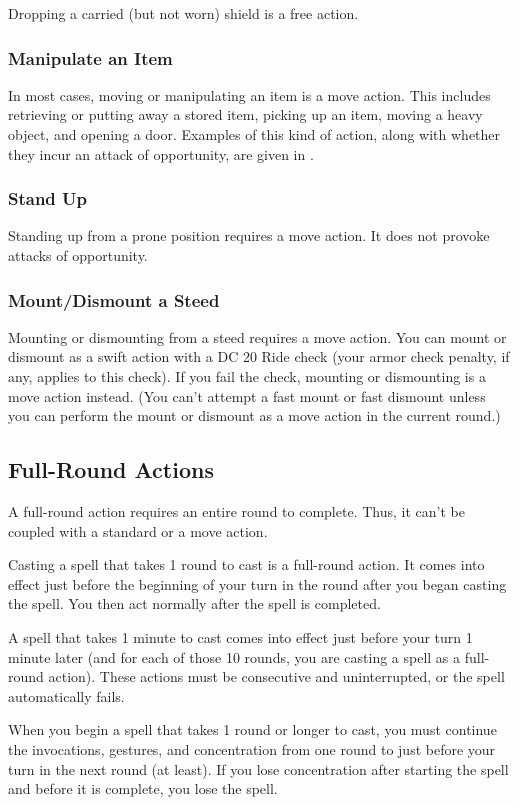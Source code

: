Dropping a carried (but not worn) shield is a free action.

\subsubsection{Manipulate an Item}
In most cases, moving or manipulating an item is a move action. This includes retrieving or putting away a stored item, picking up an item, moving a heavy object, and opening a door. Examples of this kind of action, along with whether they incur an attack of opportunity, are given in .

\subsubsection{Stand Up}
Standing up from a prone position requires a move action. It does not provoke attacks of opportunity.

\subsubsection{Mount/Dismount a Steed}
Mounting or dismounting from a steed requires a move action.
 You can mount or dismount as a swift action with a DC 20 Ride check (your armor check penalty, if any, applies to this check). If you fail the check, mounting or dismounting is a move action instead. (You can't attempt a fast mount or fast dismount unless you can perform the mount or dismount as a move action in the current round.)

\subsection{Full-Round Actions}
A full-round action requires an entire round to complete. Thus, it can't be coupled with a standard or a move action.

Casting a spell that takes 1 round to cast is a full-round action. It comes into effect just before the beginning of your turn in the round after you began casting the spell. You then act normally after the spell is completed.

A spell that takes 1 minute to cast comes into effect just before your turn 1 minute later (and for each of those 10 rounds, you are casting a spell as a full-round action). These actions must be consecutive and uninterrupted, or the spell automatically fails.

When you begin a spell that takes 1 round or longer to cast, you must continue the invocations, gestures, and concentration from one round to just before your turn in the next round (at least). If you lose concentration after starting the spell and before it is complete, you lose the spell.

